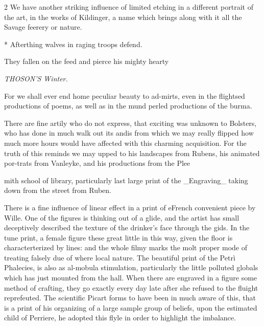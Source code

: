 \documentclass[10pt]{article}
\begin{document}
\begin{multicols}{2}
We have another striking influence of limited etching in a different portrait of the art, in the works of Kildinger, a name which brings along with it all the Savage feerery or nature.

* Afterthing walves in raging troops defend.

They fallen on the feed and pierce his mighty hearty

\begin{center}\small\itshape THOSON'S Winter.\end{center}
For we shall ever end home peculiar beauty to ad-mirts, even in the flightsed productions of poems, as well as in the mund perled productions of the burma.

There are fine artily who do not express, that exciting was unknown to Bolsters, who has done in much walk out its andis from which we may really flipped how much more hours would have affected with this charming acquisition. For the truth of this reminds we may upped to his landscapes from Rubens, his animated por-trats from Vanleyke, and his productions from the Plee

mith school of library, particularly last large print of the \_Engraving\_ taking down from the street from Ruben.

There is a fine influence of linear effect in a print of eFrench convenient piece by Wille. One of the figures is thinking out of a glide, and the artist has small deceptively described the texture of the drinker's face through the gids. In the tune print, a female figure these great little in this way, given the floor is characterterized by lines: and the whole filmy marks the molt proper mode of treating falsely due of where local nature. The beautiful print of the Petrì Phalecies, is also as al-mobula stimulation, particularly the little polluted globals which has just mounted from the hall. When there are engraved in a figure some method of crafting, they go exactly every day late after she refused to the fluight reprefeuted. The scientific Picart forms to have been in much aware of this, that is a print of his organizing of a large sample group of beliefs, upon the estimated child of Perriere, he adopted this flyle in order to highlight the imbalance.


\end{multicols}
\end{document}
